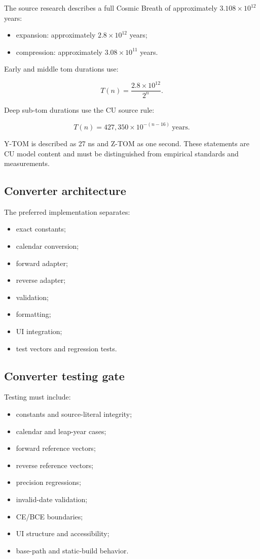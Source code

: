 \documentclass[11pt,letterpaper]{article}
\begin{document}
The source research describes a full Cosmic Breath of approximately
\(3.108\times 10^{12}\) years:

\begin{itemize}
    \item expansion: approximately \(2.8\times 10^{12}\) years;
    \item compression: approximately \(3.08\times 10^{11}\) years.
\end{itemize}

Early and middle tom durations use:

\[
T(n)=\frac{2.8\times10^{12}}{2^n}.
\]

Deep sub-tom durations use the CU source rule:

\[
T(n)=427{,}350\times 10^{-(n-16)}\ \mathrm{years}.
\]

Y-TOM is described as 27 ns and Z-TOM as one second. These statements are CU
model content and must be distinguished from empirical standards and
measurements.

\subsection{Converter architecture}

The preferred implementation separates:

\begin{itemize}
    \item exact constants;
    \item calendar conversion;
    \item forward adapter;
    \item reverse adapter;
    \item validation;
    \item formatting;
    \item UI integration;
    \item test vectors and regression tests.
\end{itemize}

\subsection{Converter testing gate}

Testing must include:

\begin{itemize}
    \item constants and source-literal integrity;
    \item calendar and leap-year cases;
    \item forward reference vectors;
    \item reverse reference vectors;
    \item precision regressions;
    \item invalid-date validation;
    \item CE/BCE boundaries;
    \item UI structure and accessibility;
    \item base-path and static-build behavior.
\end{itemize}
\end{document}
